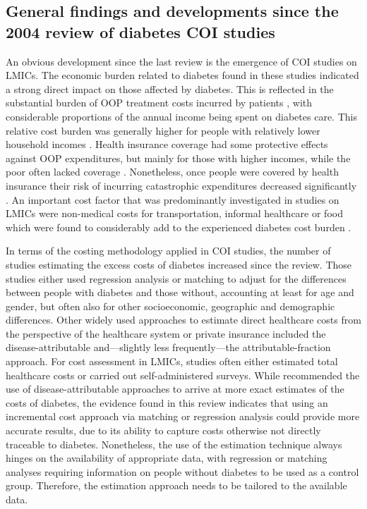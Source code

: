 \subsection{General findings and developments since the 2004 review of diabetes COI studies}
An obvious development since the last review is the emergence of \ac{COI} studies on \acp{LMIC}. The economic burden related to diabetes found in these studies indicated a strong direct impact on those affected by diabetes. This is reflected in the substantial burden of \ac{OOP} treatment costs incurred by patients \parencite{Smith-Spangler2012,Suleiman2006,Arredondo2007,Esteghamati2009,Wang2009b,Ramachandran2007d,Khowaja2007a,Elrayah-Eliadarous2010b,Chatterjee2011c,Tharkar2010a,Wang2010c}, with considerable proportions of the annual income being spent on diabetes care. This relative cost burden was generally higher for people with relatively lower household incomes \parencite{Ramachandran2007d,Khowaja2007a,Tharkar2010a}. Health insurance coverage had some protective effects against \ac{OOP} expenditures, but mainly for those with higher incomes, while the poor often lacked coverage \parencite{Ramachandran2007d,Khowaja2007a,Tharkar2010a}. Nonetheless, once people were covered by health insurance their risk of incurring catastrophic expenditures decreased significantly \parencite{Smith-Spangler2012}. An important cost factor that was predominantly investigated in studies on \acp{LMIC} were non-medical costs for transportation, informal healthcare or food which were found to considerably add to the experienced diabetes cost burden \parencite{Esteghamati2009,Wang2009b,Wang2009f,Chatterjee2011c,Tharkar2010a}.

In terms of the costing methodology applied in \ac{COI} studies, the number of studies estimating the excess costs of diabetes increased since the \textcite{Ettaro2004} review. Those studies either used regression analysis or matching to adjust for the differences between people with diabetes and those without, accounting at least for age and gender, but often also for other socioeconomic, geographic and demographic differences. Other widely used approaches to estimate direct healthcare costs from the perspective of the healthcare system or private insurance included the disease-attributable and---slightly less frequently---the attributable-fraction approach. For cost assessment in \acp{LMIC}, studies often either estimated total healthcare costs or carried out self-administered surveys. While \textcite{Ettaro2004} recommended the use of disease-attributable approaches to arrive at more exact estimates of the costs of diabetes, the evidence found in this review indicates that using an incremental cost approach via matching or regression analysis could provide more accurate results, due to its ability to capture costs otherwise not directly traceable to diabetes. Nonetheless, the use of the estimation technique always hinges on the availability of appropriate data, with regression or matching analyses requiring information on people without diabetes to be used as a control group. Therefore, the estimation approach needs to be tailored to the available data. 

